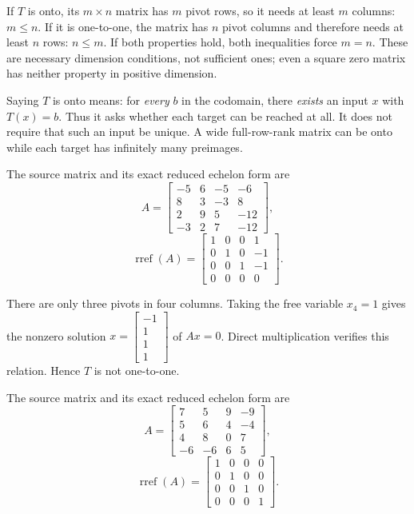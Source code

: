 If $T$ is onto, its $m\times n$ matrix has $m$ pivot rows,
so it needs at least $m$ columns: $\boxed{m\le n}$.
If it is one-to-one, the matrix has $n$ pivot columns and therefore
needs at least $n$ rows: $\boxed{n\le m}$.
If both properties hold, both inequalities force $m=n$. These are
necessary dimension conditions, not sufficient ones; even a square
zero matrix has neither property in positive dimension.

Saying $T$ is onto means: for \emph{every} $b$ in the codomain,
there \emph{exists} an input $x$ with $T(x)=b$. Thus it asks
whether each target can be reached at all. It does not require that
such an input be unique. A wide full-row-rank matrix can be onto
while each target has infinitely many preimages.



The source matrix and its exact reduced echelon form are
\[ A=\begin{bmatrix}-5 & 6 & -5 & -6\\8 & 3 & -3 & 8\\2 & 9 & 5 & -12\\-3 & 2 & 7 & -12\end{bmatrix},\]
\[ \operatorname{rref}(A)=\begin{bmatrix}1 & 0 & 0 & 1\\0 & 1 & 0 & -1\\0 & 0 & 1 & -1\\0 & 0 & 0 & 0\end{bmatrix}.\]

There are only three pivots in four columns. Taking the free variable $x_4=1$ gives the nonzero solution $x=\begin{bmatrix}-1\\1\\1\\1\end{bmatrix}$ of $Ax=0$. Direct multiplication verifies this relation. Hence $T$ is not one-to-one.



The source matrix and its exact reduced echelon form are
\[ A=\begin{bmatrix}7 & 5 & 9 & -9\\5 & 6 & 4 & -4\\4 & 8 & 0 & 7\\-6 & -6 & 6 & 5\end{bmatrix},\]
\[ \operatorname{rref}(A)=\begin{bmatrix}1 & 0 & 0 & 0\\0 & 1 & 0 & 0\\0 & 0 & 1 & 0\\0 & 0 & 0 & 1\end{bmatrix}.\]

